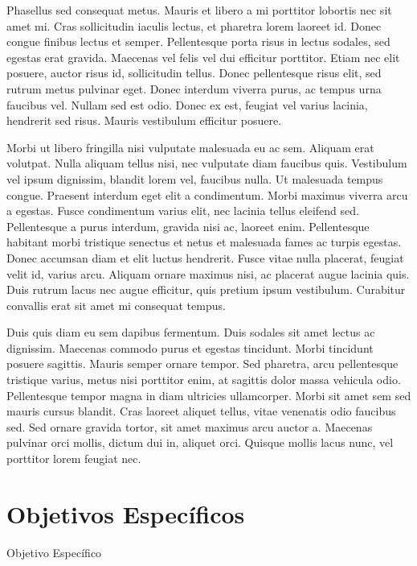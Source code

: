  Phasellus sed consequat metus. Mauris et libero a mi porttitor lobortis nec sit
amet mi. Cras sollicitudin iaculis lectus, et pharetra lorem laoreet id. Donec
congue finibus lectus et semper. Pellentesque porta risus in lectus sodales, sed
egestas erat gravida. Maecenas vel felis vel dui efficitur porttitor. Etiam nec
elit posuere, auctor risus id, sollicitudin tellus. Donec pellentesque risus
elit, sed rutrum metus pulvinar eget. Donec interdum viverra purus, ac tempus
urna faucibus vel. Nullam sed est odio. Donec ex est, feugiat vel varius
lacinia, hendrerit sed risus. Mauris vestibulum efficitur posuere.

Morbi ut libero fringilla nisi vulputate malesuada eu ac sem. Aliquam
erat volutpat. Nulla aliquam tellus nisi, nec vulputate diam faucibus
quis. Vestibulum vel ipsum dignissim, blandit lorem vel, faucibus nulla.
Ut malesuada tempus congue. Praesent interdum eget elit a condimentum.
Morbi maximus viverra arcu a egestas. Fusce condimentum varius elit,
nec lacinia tellus eleifend sed. Pellentesque a purus interdum, gravida
nisi ac, laoreet enim. Pellentesque habitant morbi tristique senectus
et netus et malesuada fames ac turpis egestas. Donec accumsan diam et
elit luctus hendrerit. Fusce vitae nulla placerat, feugiat velit id,
varius arcu. Aliquam ornare maximus nisi, ac placerat augue lacinia
quis. Duis rutrum lacus nec augue efficitur, quis pretium ipsum
vestibulum. Curabitur convallis erat sit amet mi consequat tempus.

Duis quis diam eu sem dapibus fermentum. Duis sodales sit amet lectus
ac dignissim. Maecenas commodo purus et egestas tincidunt. Morbi tincidunt
 posuere sagittis. Mauris semper ornare tempor. Sed pharetra, arcu pellentesque
 tristique varius, metus nisi porttitor enim, at sagittis dolor massa vehicula
 odio. Pellentesque tempor magna in diam ultricies ullamcorper. Morbi sit amet
 sem sed mauris cursus blandit. Cras laoreet aliquet tellus, vitae venenatis
 odio faucibus sed. Sed ornare gravida tortor, sit amet maximus arcu auctor
 a. Maecenas pulvinar orci mollis, dictum dui in, aliquet orci. Quisque mollis
 lacus nunc, vel porttitor lorem feugiat nec.
\section{Objetivos Específicos}
Objetivo Específico